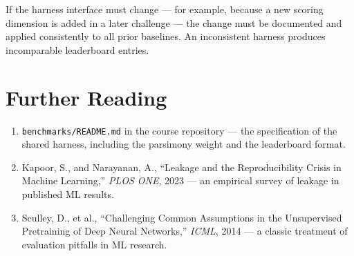 If the harness interface must change — for example, because a new scoring dimension is added in a later challenge — the change must be documented and applied consistently to all prior baselines.
An inconsistent harness produces incomparable leaderboard entries.

\section*{Further Reading}

\begin{small}
\begin{enumerate}
\item \texttt{benchmarks/README.md} in the course repository — the specification of the shared harness, including the parsimony weight and the leaderboard format.
\item Kapoor, S., and Narayanan, A., ``Leakage and the Reproducibility Crisis in Machine Learning,'' \emph{PLOS ONE}, 2023 — an empirical survey of leakage in published ML results.
\item Sculley, D., et al., ``Challenging Common Assumptions in the Unsupervised Pretraining of Deep Neural Networks,'' \emph{ICML}, 2014 — a classic treatment of evaluation pitfalls in ML research.
\end{enumerate}
\end{small}
